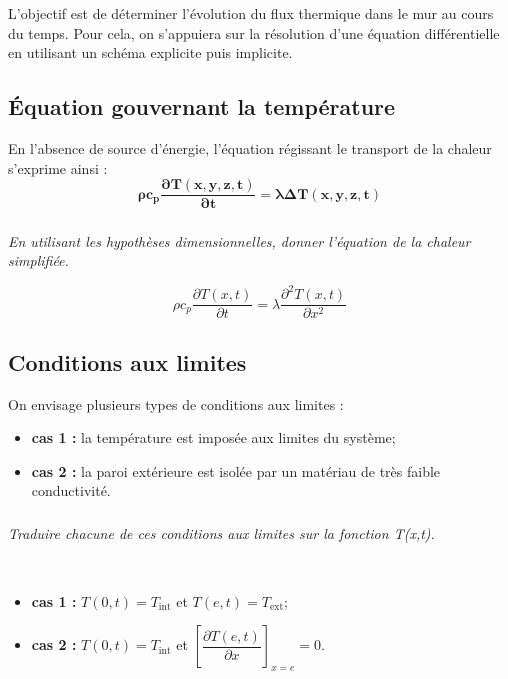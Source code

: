 \documentclass[10pt,fleqn]{article} %
\begin{document}
\begin{obj}
L'objectif est de déterminer l'évolution du flux thermique dans le mur au cours du temps. Pour cela, on s'appuiera sur la résolution d'une équation différentielle en utilisant un schéma explicite puis implicite.
\end{obj}
\subsection{Équation gouvernant la température}

En l'absence de source d'énergie, l'équation régissant le transport de la chaleur s'exprime ainsi :
\begin{equation}
\mathbf{\rho c_p \dfrac{\partial T(x,y,z,t)}{\partial t} =  \lambda  \Delta T(x,y,z,t)}
\end{equation}


\subparagraph{}\textit{En utilisant les hypothèses dimensionnelles, donner l'équation de la chaleur simplifiée. }
\ifprof
\begin{corrige}
$$ 
\rho c_p \dfrac{\partial T(x,t)}{\partial t} =  \lambda  \dfrac{\partial^2 T(x,t)}{\partial x^2}
$$
\end{corrige}
\else
\fi

\subsection{Conditions aux limites}

On envisage  plusieurs types de conditions aux limites :
\begin{itemize}
\item \textbf{cas 1 :} la température est imposée aux limites du système;
\item \textbf{cas 2 :} la paroi extérieure est isolée par un matériau de très faible conductivité. 
\end{itemize}

\subparagraph{}\textit{Traduire chacune de ces conditions aux limites sur la fonction T(x,t).} 
\ifprof
\begin{corrige} ~\\
\begin{itemize}
\item \textbf{cas 1 :} $T(0,t)=T_{\text{int}}$ et $T(e,t)=T_{\text{ext}}$;
\item \textbf{cas 2 :} $T(0,t)=T_{\text{int}}$ et $\left[ \dfrac{\partial T(e,t)}{\partial x} \right]_{x=e}=0$.
\end{itemize}
\end{corrige}
\end{document}
